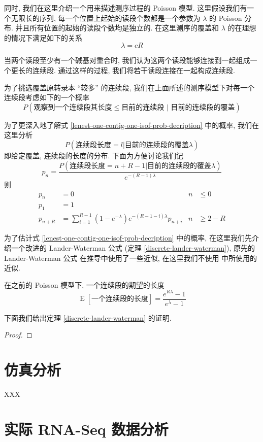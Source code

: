 同时, 我们在这里介绍一个用来描述测序过程的 Poisson 模型. 
这里假设我们有一个无限长的序列, 
每一个位置上起始的读段个数都是一个参数为 $\lambda$ 的 Poisson 分布. 
并且所有位置的起始的读段个数均是独立的. 
在这里测序的覆盖和 $\lambda$ 的在理想的情况下满足如下的关系
\[
\lambda = c R
\]

当两个读段至少有一个碱基对重合时, 
我们认为这两个读段能够连接到一起组成一个更长的连续段. 通过这样的过程, 
我们将若干读段连接在一起构成连续段. 

为了挑选覆盖原转录本 ``较多'' 的连续段, 
我们在上面所述的测序模型下对每一个连续段考虑如下的一个概率
\begin{equation}
\label{lenest-one-contig-one-isof-prob-decription}
P(\text{观察到一个连续段其长度} \leq \text{目前的连续段 } |\text{ 目前的连续段的覆盖})
\end{equation}

为了更深入地了解式 \eqref{lenest-one-contig-one-isof-prob-decription} 中的概率, 
我们在这里分析
\begin{equation}
\label{lenest-one-cont-prob-distr}
P(\text{连续段长度} = l | \text{目前的连续段的覆盖} \lambda)
\end{equation}
即给定覆盖, 连续段的长度的分布. 
下面为方便讨论我们记
\begin{equation}
p_n =  \frac{P(\text{连续段长度} = n+R-1 | \text{目前的连续段的覆盖} \lambda)}{e^{-(R-1)\lambda}}
\end{equation}
则
\begin{align}
p_n &= 0 & n &\leq 0 \\
p_1 &= 1 & & \\
p_{n+R} &= \sum_{i=1}^{R-1} (1-e^{-\lambda}) e^{-(R-1-i)\lambda} p_{n+i} & n &\geq 2-R
\end{align}

为了估计式 \eqref{lenest-one-contig-one-isof-prob-decription} 中的概率, 
在这里我们先介绍一个改进的 Lander-Waterman 公式 (定理 \ref{discrete-lander-waterman}), 
原先的 Lander-Waterman 公式 \cite{lander1988genomic} 在推导中使用了一些近似, 
在这里我们不使用  中所使用的近似. 

\begin{thm}
\label{discrete-lander-waterman}
在之前的 Poisson 模型下, 一个连续段的期望的长度
\begin{equation}
\operatorname{E}[\text{一个连续段的长度}] = \frac{e^{R\lambda} - 1}{e^\lambda - 1} 
\end{equation}
\end{thm}

下面我们给出定理 \ref{discrete-lander-waterman} 的证明. 

\begin{proof}
\end{proof}

\section{仿真分析}
XXX

\section{实际 RNA-Seq 数据分析}



